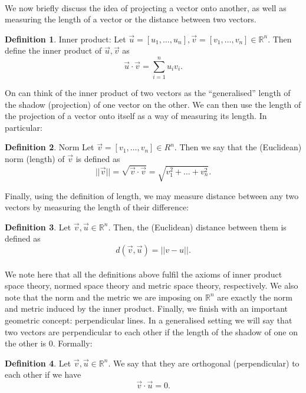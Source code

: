 \documentclass{article}
\theoremstyle{definition}
\newtheorem{definition}{Definition}[section]
\theoremstyle{example}
\newcommand{\Reals}{\mathbb{R}}
\newcommand{\norm}[1]{||#1||}
\begin{document}
\paragraph{} We now briefly discuss the idea of projecting a vector onto
another, as well as measuring the length of a vector or the distance between two
vectors.
\begin{definition}{Inner product:}
  Let $\vec{u} = [u_1, \hdots, u_n], \vec{v} = [v_1, \hdots, v_n] \in \Reals^n$.
  Then define the inner product of $\vec{u}, \vec{v}$ as
  \[
    \vec{u} \cdot \vec{v} = \sum_{i = 1}^n u_iv_i.
  \]
\end{definition}
On can think of the inner product of two vectors as the ``generalised'' length
of the shadow (projection) of one vector on the other.
We can then use the length of the projection of a vector onto itself as a way of
measuring its length. In particular:
\begin{definition}{Norm}
  Let $\vec{v} = [v_1, \hdots, v_n] \in R^n$. Then we say that the (Euclidean) norm (length) of
  $\vec{v}$ is defined as
  \[
    \norm{\vec{v}} = \sqrt{\vec{v} \cdot \vec{v}} = \sqrt{v_1^2 + \hdots + v_n^2}.
  \]
\end{definition}
Finally, using the definition of length, we may measure distance between any two
vectors by measuring the length of their difference:
\begin{definition}
  Let $\vec{v}, \vec{u} \in \Reals^n$. Then, the (Euclidean) distance between
  them is defined as
  \[
    d(\vec{v}, \vec{u}) = \norm{v - u}.
  \]
\end{definition}
\paragraph{} We note here that all the definitions above fulfil the axioms of
inner product space theory, normed space theory and metric space theory,
respectively. We also note that the norm and the metric we are imposing on
$\Reals^n$ are exactly the norm and metric induced by the inner product.
Finally, we finish with an important geometric concept: perpendicular lines.
In a generalised setting we will say that two vectors are perpendicular to each
other if the length of the shadow of one on the other is $0$. Formally:
\begin{definition}
  Let $\vec{v}, \vec{u} \in \Reals^n$. We say that they are orthogonal
  (perpendicular) to each other if we have
  \[
    \vec{v} \cdot \vec{u} = 0.
  \]
\end{definition}
\end{document}
